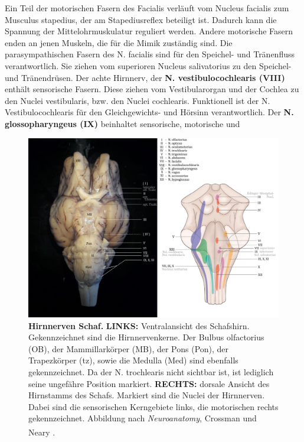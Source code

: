 \documentclass[12pt,a4paper,pdftex]{article}
\begin{document}
Ein Teil der motorischen Fasern des Facialis verläuft vom Nucleus facialis zum Musculus stapedius, der am Stapediusreflex beteiligt ist. Dadurch kann die Spannung der Mittelohrmuskulatur reguliert werden. Andere motorische Fasern enden an jenen Muskeln, die für die Mimik zuständig sind.  Die parasympathischen Fasern des N. facialis sind für den Speichel- und Tränenfluss verantwortlich. Sie ziehen vom superioren Nucleus salivatorius zu den Speichel- und Tränendrüsen. Der achte Hirnnerv, der \textbf{N. vestibulocochlearis (VIII)} enthält sensorische Fasern. Diese ziehen vom Vestibularorgan und der Cochlea zu den Nuclei vestibularis, bzw. den Nuclei cochlearis. Funktionell ist der N. Vestibulocochlearis für den Gleichgewichts- und Hörsinn verantwortlich. Der \textbf{N. glossopharyngeus (IX)} beinhaltet sensorische, motorische und 

\begin{figure}[H]
    \centering
    \includegraphics[width=\textwidth]{pictures/Bilder_Jule/Schaf/Aussenansicht/Hirnnerven.png}
    \caption[Hirnnerven Schaf]{\textbf{Hirnnerven Schaf.} \textbf{LINKS:} Ventralansicht des Schafshirn. Gekennzeichnet sind die Hirnnervenkerne. Der Bulbus olfactorius (OB), der Mammillarkörper (MB), der Pons (Pon), der Trapezkörper (tz), sowie die Medulla (Med) sind ebenfalls gekennzeichnet. Da der N. trochlearis nicht sichtbar ist, ist lediglich seine ungefähre Position markiert. \textbf{RECHTS:} dorsale Ansicht des Hirnstamms des Schafs. Markiert sind die Nuclei der Hirnnerven. Dabei sind die sensorischen Kerngebiete links, die motorischen rechts gekennzeichnet. Abbildung nach \textit{Neuroanatomy}, Crossman und Neary \textsuperscript{\cite[10]{crossman2014neuroanatomy}}.}
    \label{fig:hirnnerven_schaf}
\end{figure}
\end{document}
